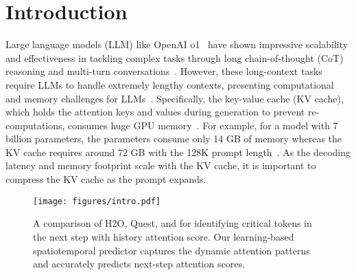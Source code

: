 \section{Introduction}

Large language models (LLM) like OpenAI o1~\citep{openai2024o1} have shown impressive scalability and effectiveness in tackling complex tasks through long chain-of-thought (CoT) reasoning and multi-turn conversations~\citep{minaee2024large, huang2024understanding}. 
However, these long-context tasks require LLMs to handle extremely lengthy contexts, presenting computational and memory challenges for LLMs~\citep{zhou2024survey}. 
Specifically, the key-value cache (KV cache), which holds the attention keys and values during generation to prevent re-computations, consumes huge GPU memory~\citep{li2024survey}. 
For example, for a model with 7 billion parameters, the parameters consume only 14 GB of memory whereas the KV cache requires around 72 GB with the 128K prompt length~\citep{yang2024pyramidinfer}. 
As the decoding latency and memory footprint scale with the KV cache, it is important to compress the KV cache as the prompt expands. 

\begin{figure}[t]
    \centering
    \texttt{[image: figures/intro.pdf]}
    \caption{A comparison of H2O, Quest, and \ours for identifying critical tokens in the next step with history attention score. Our learning-based spatiotemporal predictor captures the dynamic attention patterns and accurately predicts next-step attention scores.}
    \vspace{-0.7cm}
    
    \label{fig:intro_comparison}
\end{figure}

